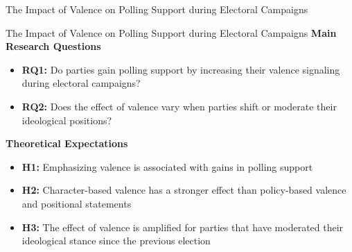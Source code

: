 \documentclass[9pt, aspectratio=169]{beamer}
\newcommand{\customcites}[1]{\textcolor{blue}{\footnotesize\parencites{#1}}}
\begin{document}
\begin{section}{The Impact of Valence on Polling Support during Electoral Campaigns}
\begin{frame}{The Impact of Valence on Polling Support during Electoral Campaigns}
    \textbf{Main Research Questions}     \vspace{0.2cm}
    \begin{itemize}
        \item \textbf{RQ1:} Do parties gain polling support by increasing their valence signaling during electoral campaigns?\vspace{0.2cm}
        \item \textbf{RQ2:} Does the effect of valence vary when parties shift or moderate their ideological positions?\vspace{0.2cm}
    \end{itemize}
\vspace{0.3cm}
    \textbf{Theoretical Expectations} \vspace{0.2cm}
    \begin{itemize}
        \item \textbf{H1:} Emphasizing valence is associated with gains in polling support \customcites{adams2011anybody, abney2013valence}\vspace{0.2cm}
        \item \textbf{H2:} Character-based valence has a stronger effect than policy-based valence and positional statements \customcites{clark2009valence, Lenz2012}\vspace{0.2cm}
        \item \textbf{H3:} The effect of valence is amplified for parties that have moderated their ideological stance since the previous election
    \end{itemize}
\end{frame}


\end{section}
\end{document}
